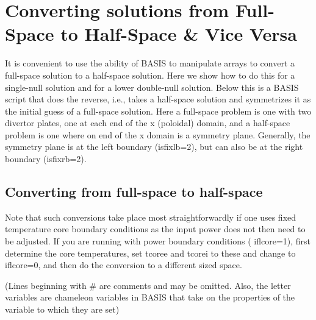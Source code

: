 \documentclass [12pt]{article}
\begin{document}
 

\section{Converting solutions from Full-Space to Half-Space \& Vice Versa}

It is convenient to use the ability of {\sf BASIS} to manipulate arrays to
convert a full-space solution to a half-space solution.  Here we show how to
do this for a single-null solution and for a lower double-null solution.
Below this is a {\sf BASIS} script that does the reverse, i.e., takes a
half-space solution and symmetrizes it as the initial guess of a full-space
solution.  Here a full-space problem is one with two divertor plates, one at
each end of the x (poloidal) domain, and a half-space problem is one where on
end of the x domain is a symmetry plane.  Generally, the symmetry plane is at
the left boundary ({\sf isfixlb=2}), but can also be at the right boundary
({\sf isfixrb=2}).

\subsection{Converting from full-space to half-space} 

Note that such conversions take place most straightforwardly if one uses fixed
temperature core boundary conditions as the input power does not then need to
be adjusted. If you are running with power boundary conditions ({\sf
  iflcore=1}), first determine the core temperatures, set tcoree and tcorei to
these and change to {\sf iflcore=0}, and then do the conversion to a different
sized space.


(Lines beginning with \# are comments and may be omitted.  Also, the letter
variables are chameleon variables in {\sf BASIS} that take on the properties
of the variable to which they are set)
\end{document}
